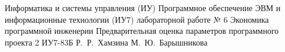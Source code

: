 \documentclass{bmstu}
\begin{document}
\makereporttitle
	{Информатика и системы управления (ИУ)}
	{Программное обеспечение ЭВМ и информационные технологии (ИУ7)}
	{лабораторной работе № 6}
	{Экономика программной инженерии}
	{Предварительная оценка параметров программного проекта}
	{2}
	{ИУ7-83Б}
	{Р.~Р.~Хамзина}
	{М.~Ю.~Барышникова}


\end{document}
